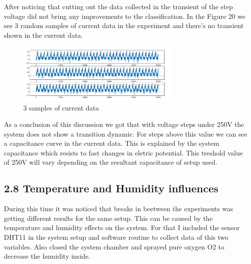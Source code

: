     After noticing that cutting out the data collected in the transient of the step voltage did not bring any improvements to the classification.
    In the Figure 20 we see 3 random samples of current data in the experiment and there's no transient shown in the current data.

    \begin{figure}[H]
        \center
        \includegraphics[width=8cm]{images/random_samples.png}
        \caption{ 3 samples of current data }
    \end{figure}

    As a conclusion of this discussion we got that with voltage steps under 250V the system does not show a transition dynamic. 
    For steps above this value we can see a capacitance curve in the current data. This is explained by the system capacitance which resists to fast changes in eletric potential.
    This treshold value of 250V will vary depending on the resultant capacitance of setup used.


\subsection*{2.8 Temperature and Humidity influences}

    During this time it was noticed that breaks in beetween the experiments was getting different results for the same setup. This can be caused by the temperature and humidity effects on the system.
    For that I included the sensor DHT11 in the system setup and software routine to collect data of this two variables. Also closed the system chamber and sprayed pure oxygen O2 to decrease the humidity inside.
    

